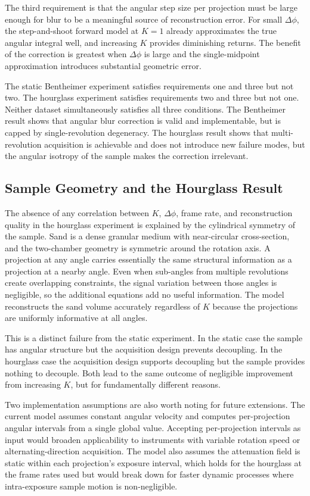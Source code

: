 \documentclass[12pt, a4paper, twoside]{report}
\begin{document}
The third requirement is that the angular step size per projection must be large enough for blur to be a meaningful source of reconstruction error. For small $\Delta\phi$, the step-and-shoot forward model at $K = 1$ already approximates the true angular integral well, and increasing $K$ provides diminishing returns. The benefit of the correction is greatest when $\Delta\phi$ is large and the single-midpoint approximation introduces substantial geometric error.

The static Bentheimer experiment satisfies requirements one and three but not two. The hourglass experiment satisfies requirements two and three but not one. Neither dataset simultaneously satisfies all three conditions. The Bentheimer result shows that angular blur correction is valid and implementable, but is capped by single-revolution degeneracy. The hourglass result shows that multi-revolution acquisition is achievable and does not introduce new failure modes, but the angular isotropy of the sample makes the correction irrelevant.

\subsection{Sample Geometry and the Hourglass Result}
\label{subsec:cont_disc_dynamic}

The absence of any correlation between $K$, $\Delta\phi$, frame rate, and reconstruction quality in the hourglass experiment is explained by the cylindrical symmetry of the sample. Sand is a dense granular medium with near-circular cross-section, and the two-chamber geometry is symmetric around the rotation axis. A projection at any angle carries essentially the same structural information as a projection at a nearby angle. Even when sub-angles from multiple revolutions create overlapping constraints, the signal variation between those angles is negligible, so the additional equations add no useful information. The model reconstructs the sand volume accurately regardless of $K$ because the projections are uniformly informative at all angles.

This is a distinct failure from the static experiment. In the static case the sample has angular structure but the acquisition design prevents decoupling. In the hourglass case the acquisition design supports decoupling but the sample provides nothing to decouple. Both lead to the same outcome of negligible improvement from increasing $K$, but for fundamentally different reasons.

Two implementation assumptions are also worth noting for future extensions. The current model assumes constant angular velocity and computes per-projection angular intervals from a single global value. Accepting per-projection intervals as input would broaden applicability to instruments with variable rotation speed or alternating-direction acquisition. The model also assumes the attenuation field is static within each projection's exposure interval, which holds for the hourglass at the frame rates used but would break down for faster dynamic processes where intra-exposure sample motion is non-negligible.
\end{document}
